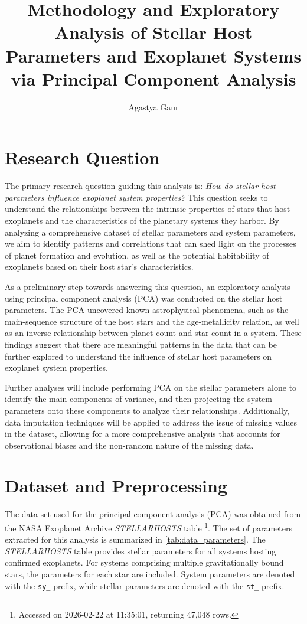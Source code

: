 \documentclass[preprint]{aastex631}
\begin{document}
\title{Methodology and Exploratory Analysis of Stellar Host Parameters and Exoplanet Systems via Principal Component Analysis}
\author{Agastya Gaur}
\noaffiliation

\section{Research Question}

The primary research question guiding this analysis is: \textit{How do stellar host parameters influence exoplanet system properties?} This question seeks to understand the relationships between the intrinsic properties of stars that host exoplanets and the characteristics of the planetary systems they harbor. By analyzing a comprehensive dataset of stellar parameters and system parameters, we aim to identify patterns and correlations that can shed light on the processes of planet formation and evolution, as well as the potential habitability of exoplanets based on their host star's characteristics.

As a preliminary step towards answering this question, an exploratory analysis using principal component analysis (PCA) was conducted on the stellar host parameters. The PCA uncovered known astrophysical phenomena, such as the main-sequence structure of the host stars and the age-metallicity relation, as well as an inverse relationship between planet count and star count in a system. These findings suggest that there are meaningful patterns in the data that can be further explored to understand the influence of stellar host parameters on exoplanet system properties.

Further analyses will include performing PCA on the stellar parameters alone to identify the main components of variance, and then projecting the system parameters onto these components to analyze their relationships. Additionally, data imputation techniques will be applied to address the issue of missing values in the dataset, allowing for a more comprehensive analysis that accounts for observational biases and the non-random nature of the missing data.

\section{Dataset and Preprocessing}

The data set used for the principal component analysis (PCA) was obtained from the NASA Exoplanet Archive \textit{STELLARHOSTS} table \citep{nasaexoplanetarchivePlanetarySystemsTable2026}\footnote{Accessed on 2026-02-22 at 11:35:01, returning 47,048 rows.}. The set of parameters extracted for this analysis is summarized in \autoref{tab:data_parameters}. The \textit{STELLARHOSTS} table provides stellar parameters for all systems hosting confirmed exoplanets. For systems comprising multiple gravitationally bound stars, the parameters for each star are included. System parameters are denoted with the \verb|sy_| prefix, while stellar parameters are denoted with the \verb|st_| prefix.
\end{document}
